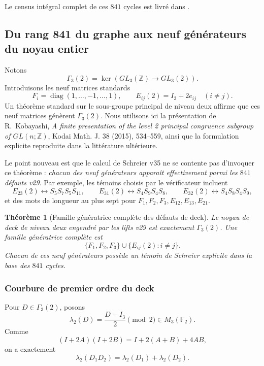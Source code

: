 \documentclass[11pt,a4paper]{article}
\newtheorem{theorem}{Théorème}[section]
\begin{document}
Le census int\'egral complet de ces $841$ cycles est livr\'e dans
.

\subsection{Du rang 841 du graphe aux neuf g\'en\'erateurs du noyau entier}

Notons
\[
 \Gamma_3(2)=\ker\!\left(GL_3(\mathbb Z)\longrightarrow GL_3(2)\right).
\]
Introduisons les neuf matrices standards
\[
 F_i=\operatorname{diag}(1,\ldots,-1,\ldots,1),
 \qquad
 E_{ij}(2)=I_3+2e_{ij}\quad(i\neq j).
\]
Un th\'eor\`eme standard sur le sous-groupe principal de niveau deux affirme que ces neuf matrices
g\'en\`erent $\Gamma_3(2)$. Nous utilisons ici la pr\'esentation de R.~Kobayashi,
\emph{A finite presentation of the level 2 principal congruence subgroup of $GL(n;\mathbb Z)$},
Kodai Math. J. 38 (2015), 534--559, ainsi que la formulation explicite reproduite dans la litt\'erature
ult\'erieure.

Le point nouveau est que le calcul de Schreier v35 ne se contente pas d'invoquer ce th\'eor\`eme :
\emph{chacun des neuf g\'en\'erateurs appara\^it effectivement parmi les $841$ d\'efauts v29}.
Par exemple, les t\'emoins choisis par le v\'erificateur incluent
\[
 E_{23}(2)\leftrightarrow S_5S_7S_5S_{11},
 \qquad
 E_{31}(2)\leftrightarrow S_4S_9S_4S_8,
 \qquad
 E_{32}(2)\leftrightarrow S_4S_8S_4S_9,
\]
et des mots de longueur au plus sept pour $F_1,F_2,F_3,E_{12},E_{13},E_{21}$.

\begin{theorem}[Famille g\'en\'eratrice compl\`ete des d\'efauts de deck]\label{thm:v35-deck-complete}
Le noyau de deck de niveau deux engendr\'e par les lifts v29 est exactement $\Gamma_3(2)$.
Une famille g\'en\'eratrice compl\`ete est
\begin{equation}\label{eq:v35-nine-kernel-generators}
 \boxed{\{F_1,F_2,F_3\}\cup\{E_{ij}(2):i\neq j\}.}
\end{equation}
Chacun de ces neuf g\'en\'erateurs poss\`ede un t\'emoin de Schreier explicite dans la base des
$841$ cycles.
\end{theorem}

\subsubsection{Courbure de premier ordre du deck}

Pour $D\in\Gamma_3(2)$, posons
\begin{equation}\label{eq:v35-lambda2}
 \boxed{\lambda_2(D)=\frac{D-I_3}{2}\pmod2\in M_3(\mathbb F_2).}
\end{equation}
Comme
\[
 (I+2A)(I+2B)=I+2(A+B)+4AB,
\]
on a exactement
\begin{equation}\label{eq:v35-lambda2-additive}
 \boxed{\lambda_2(D_1D_2)=\lambda_2(D_1)+\lambda_2(D_2).}
\end{equation}
\end{document}

